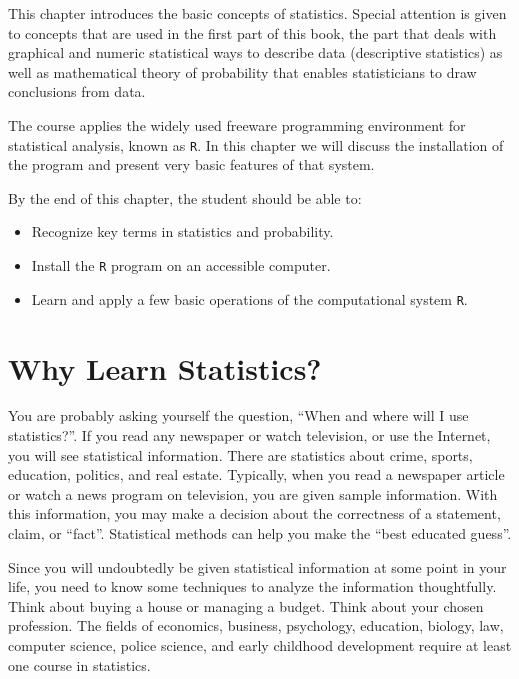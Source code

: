 \documentclass[]{krantz}
\providecommand{\tightlist}{%
  \setlength{\itemsep}{0pt}\setlength{\parskip}{0pt}}
\theoremstyle{definition}
\theoremstyle{definition}
\theoremstyle{definition}
\theoremstyle{remark}
\begin{document}
This chapter introduces the basic concepts of statistics. Special
attention is given to concepts that are used in the first part of this
book, the part that deals with graphical and numeric statistical ways to
describe data (descriptive statistics) as well as mathematical theory of
probability that enables statisticians to draw conclusions from data.

The course applies the widely used freeware programming environment for
statistical analysis, known as \texttt{R}. In this chapter we will discuss the
installation of the program and present very basic features of that
system.

By the end of this chapter, the student should be able to:

\begin{itemize}
\tightlist
\item
  Recognize key terms in statistics and probability.
\item
  Install the \texttt{R} program on an accessible computer.
\item
  Learn and apply a few basic operations of the computational system \texttt{R}.
\end{itemize}

\hypertarget{why-learn-statistics}{%
\section{Why Learn Statistics?}\label{why-learn-statistics}}

You are probably asking yourself the question, ``When and where will I
use statistics?''. If you read any newspaper or watch television, or use
the Internet, you will see statistical information. There are statistics
about crime, sports, education, politics, and real estate. Typically,
when you read a newspaper article or watch a news program on television,
you are given sample information. With this information, you may make a
decision about the correctness of a statement, claim, or ``fact''.
Statistical methods can help you make the ``best educated guess''.

Since you will undoubtedly be given statistical information at some
point in your life, you need to know some techniques to analyze the
information thoughtfully. Think about buying a house or managing a
budget. Think about your chosen profession. The fields of economics,
business, psychology, education, biology, law, computer science, police
science, and early childhood development require at least one course in
statistics.
\end{document}
